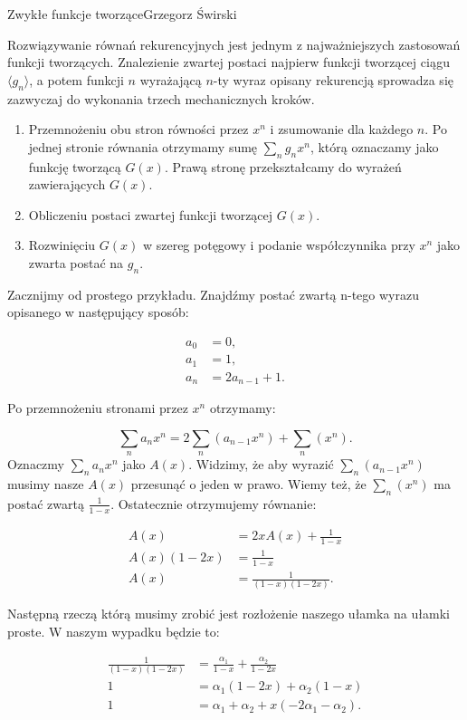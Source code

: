 \begin{referat}{Zwykłe funkcje tworzące}{Grzegorz Świrski}
\begin{teoria}
Rozwiązywanie równań rekurencyjnych jest jednym z najważniejszych
zastosowań funkcji tworzących. Znalezienie zwartej postaci najpierw
funkcji tworzącej ciągu $\langle g_n \rangle$, a potem funkcji $n$ 
wyrażającą $n$-ty wyraz opisany rekurencją sprowadza się zazwyczaj 
do wykonania trzech mechanicznych kroków.

\begin{enumerate}
\item Przemnożeniu obu stron równości przez $x^n$ i zsumowanie dla
każdego $n$. Po jednej stronie równania otrzymamy sumę $\sum_n g_nx^n$,
którą oznaczamy jako funkcję tworzącą $G(x)$. Prawą stronę przekształcamy
do wyrażeń zawierających $G(x)$.
\item Obliczeniu postaci zwartej funkcji tworzącej $G(x)$.
\item Rozwinięciu $G(x)$ w szereg potęgowy i podanie współczynnika
przy $x^n$ jako zwarta postać na $g_n$.
\end{enumerate}

Zacznijmy od prostego przykładu. Znajdźmy postać zwartą n-tego wyrazu
opisanego w następujący sposób:

\begin{align*} 
  a_0 &= 0, \\
  a_1 &= 1, \\
  a_n &= 2a_{n-1} + 1.
\end{align*}

Po przemnożeniu stronami przez $x^n$ otrzymamy:

$$ \sum_n a_n x^n = 2 \sum_n (a_{n-1} x^n) + \sum_n (x^n).$$
Oznaczmy $\sum_n a_n x^n$ jako $A(x)$. Widzimy, że aby wyrazić
$\sum_n (a_{n-1} x^n)$ musimy nasze $A(x)$ przesunąć o jeden w prawo.
Wiemy też, że $\sum_n (x^n)$ ma postać zwartą $\frac{1}{1-x}$. Ostatecznie
otrzymujemy równanie:

\begin{align*} 
  A(x) &= 2xA(x) + \frac{1}{1-x} \\
  A(x)(1-2x) &= \frac{1}{1-x} \\
  A(x) &= \frac{1}{(1-x)(1-2x)}.
\end{align*}

Następną rzeczą którą musimy zrobić jest rozłożenie naszego ułamka na
ułamki proste. W naszym wypadku będzie to:

\begin{align*}
  \frac{1}{(1-x)(1-2x)} &= \frac{\alpha_1}{1-x} + \frac{\alpha_2}{1-2x} \\
  1 &= \alpha_1(1-2x) + \alpha_2(1-x) \\
  1 &= \alpha_1 + \alpha_2 + x(-2\alpha_1 - \alpha_2).
\end{align*}


\end{teoria}
\end{referat}
